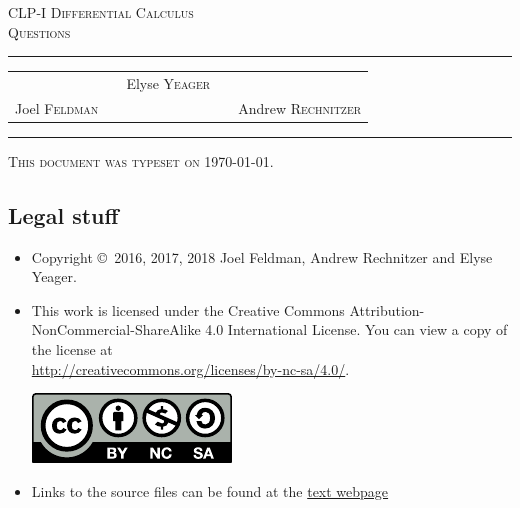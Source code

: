 \documentclass[12pt,letterpaper]{book}
\begin{document}
\setcounter{page}{0}

\begin{titlepage}
\begin{center}
\textsc{\LARGE
CLP-I Differential Calculus\\[2ex]
Questions
}\\[2ex]

\vspace{5ex}
\hrule
\vspace{5ex}

\begin{tabular}{lcccr}
&& \large Elyse \textsc{Yeager} \\[3ex]
 Joel \textsc{Feldman}
&\quad & &\quad&
Andrew \textsc{Rechnitzer}
\end{tabular}

\end{center}
\vspace{2ex}
\hrule

\vfill
\textsc{This document was typeset on \today.}
\end{titlepage}

\subsection*{Legal stuff}
\begin{itemize}
 \item Copyright \copyright\ 2016, 2017, 2018 Joel Feldman, Andrew Rechnitzer and Elyse Yeager.

\item This work is licensed under the
Creative Commons Attribution-NonCommercial-ShareAlike 4.0 International
License. You can view a copy of the license at \\
\url{http://creativecommons.org/licenses/by-nc-sa/4.0/}.
\begin{center}
 \includegraphics{by-nc-sa.pdf}
\end{center}


\item Links to the source files can be found at the \href{http://www.math.ubc.ca/~CLP/index.html}{text webpage}
\end{itemize}


\frontmatter
\end{document}
